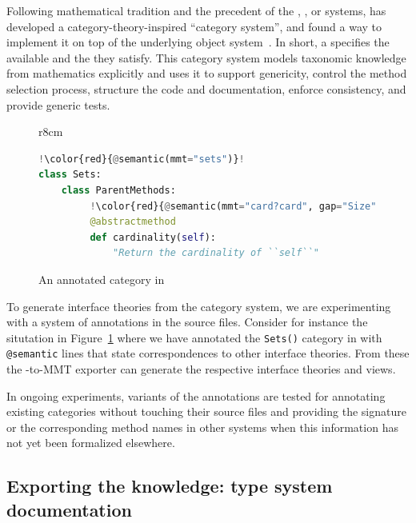 Following mathematical tradition and the precedent of the \Axiom,
\Fricas, or \MuPAD systems, \Sage has developed a
category-theory-inspired ``category system'', and found a way to
implement it on top of the underlying \Python object
system~\cite{Sage,Sage.Categories}. In short, a  specifies
the available  and the  they satisfy.
%
This category system models taxonomic knowledge from mathematics
explicitly and uses it to support genericity, control the method
selection process, structure the code and documentation, enforce
consistency, and provide generic tests.

\begin{figure}r{8cm}\vspace*{-2.5em}
\begin{lstlisting}[language=Python,escapechar=!]
!\color{red}{@semantic(mmt="sets")}!
class Sets:
    class ParentMethods:
         !\color{red}{@semantic(mmt="card?card", gap="Size")}!
         @abstractmethod
         def cardinality(self):
             "Return the cardinality of ``self``"
\end{lstlisting}
\vspace*{-.5em}
\caption{An annotated category in \Sage}\label{fig:anncat}\vspace*{-1.5em}
\end{figure}
To generate interface theories from the \Sage category system, we are experimenting with a
system of annotations in the \Sage source files. Consider for instance the situtation in
Figure~\ref{fig:anncat} where we have annotated the \texttt{Sets()} category in \Sage
with \texttt{@semantic} lines that state correspondences to other interface theories. From
these the \Sage-to-MMT exporter can generate the respective interface theories and views.

In ongoing experiments, variants of the annotations are tested for
annotating existing categories without touching their source files and
providing the signature or the corresponding method names in other
systems when this information has not yet been formalized elsewhere.


\subsection{Exporting the \GAP knowledge: type system documentation}
\label{sec:gaptypes}

